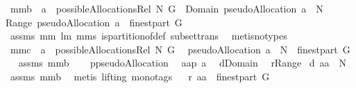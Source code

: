 \begin{isabellebody}
\isamarkupfalse%
\ mm{}{}b{\isacharcolon}\ \ {\isachardoublequoteopen}a\ {\isasymin}\ possibleAllocationsRel\ N\ G{\isachardoublequoteclose}\ \ {\isachardoublequoteopen}Domain\ {\isacharparenleft}pseudoAllocation\ a{\isacharparenright}\ {\isasymsubseteq}\ N\ {\isacharampersand}\ \isanewline
Range\ {\isacharparenleft}pseudoAllocation\ a{\isacharparenright}\ {\isacharequal}\ finestpart\ G{\isachardoublequoteclose}\ \isanewline
%
\isadelimproof
%
\endisadelimproof
%
\isatagproof
{}\isamarkupfalse%
\ assms\ mm{}{}\ lm{}{}\ mm{}{}s\ is{\isacharunderscore}partition{\isacharunderscore}of{\isacharunderscore}def\ subset{\isacharunderscore}trans\ \isamarkupfalse%
\ {\isacharparenleft}metis{\isacharparenleft}no{\isacharunderscore}types{\isacharparenright}{\isacharparenright}%
\endisatagproof
{\isafoldproof}%
%
\isadelimproof
\isanewline
%
\endisadelimproof
{}\isamarkupfalse%
\ mm{}{}c{\isacharcolon}\ \ {\isachardoublequoteopen}a\ {\isasymin}\ possibleAllocationsRel\ N\ G{\isachardoublequoteclose}\ \isanewline
{}\ {\isachardoublequoteopen}pseudoAllocation\ a\ {\isasymsubseteq}\ N\ {\isasymtimes}\ finestpart\ G{\isachardoublequoteclose}%
\isadelimproof
\ %
\endisadelimproof
%
\isatagproof
{}\isamarkupfalse%
\ assms\ mm{}{}b\ \isanewline
{}\isamarkupfalse%
\ {\isacharminus}\isanewline
{}\isamarkupfalse%
\ {\isacharquery}p{\isacharequal}pseudoAllocation\ \isamarkupfalse%
\ {\isacharquery}aa{\isacharequal}{\isachardoublequoteopen}{\isacharquery}p\ a{\isachardoublequoteclose}\ \isamarkupfalse%
\ {\isacharquery}d{\isacharequal}Domain\ \isamarkupfalse%
\ {\isacharquery}r{\isacharequal}Range\isanewline
{}\isamarkupfalse%
\ {\isachardoublequoteopen}{\isacharquery}d\ {\isacharquery}aa\ {\isasymsubseteq}\ N{\isachardoublequoteclose}\ \isamarkupfalse%
\ assms\ mm{}{}b\ \isamarkupfalse%
\ {\isacharparenleft}metis\ {\isacharparenleft}lifting{\isacharcomma}\ mono{\isacharunderscore}tags{\isacharparenright}{\isacharparenright}\isanewline
{}\isamarkupfalse%
\ \isamarkupfalse%
\ {\isachardoublequoteopen}{\isacharquery}r\ {\isacharquery}aa\ {\isasymsubseteq}\ finestpart\ G{\isachardoublequoteclose}\ \isamarkupfalse%

\end{isabellebody}
